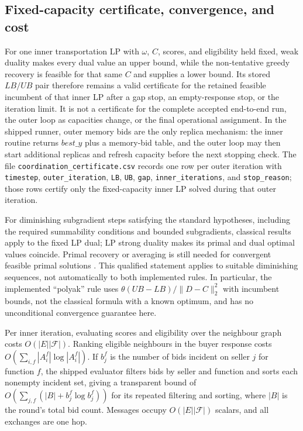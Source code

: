 \subsection{Fixed-capacity certificate, convergence, and cost}
For one inner transportation LP with $\omega$, $C$, scores, and eligibility
held fixed, weak duality makes every dual value an upper bound, while the
non-tentative greedy recovery is feasible for that same $C$ and supplies a
lower bound. Its stored $LB/UB$ pair therefore remains a valid certificate for
the retained feasible incumbent of that inner LP after a gap stop, an
empty-response stop, or the iteration limit. It is not a certificate for the
complete accepted end-to-end run, the outer loop as capacities change, or the
final operational assignment. In the shipped runner, outer memory bids are the
only replica mechanism: the inner routine returns $\textit{best\_y}$ plus a
memory-bid table, and the outer loop may then start additional replicas and
refresh capacity before the next stopping check. The file
\texttt{coordination\_certificate.csv} records one row per outer iteration with
\texttt{timestep}, \texttt{outer\_iteration}, \texttt{LB}, \texttt{UB},
\texttt{gap}, \texttt{inner\_iterations}, and \texttt{stop\_reason}; those rows
certify only the fixed-capacity inner LP solved during that outer iteration.

For diminishing subgradient steps satisfying the standard hypotheses,
including the required summability conditions and bounded subgradients,
classical results apply to the fixed LP dual; LP strong duality makes its primal
and dual optimal values coincide. Primal recovery or averaging is still needed
for convergent feasible primal solutions \citep{nedic2009,bertsekas1989}. This
qualified statement applies to suitable diminishing sequences, not
automatically to both implemented rules. In particular, the implemented
``polyak'' rule uses $\theta(UB-LB)/\lVert D-C\rVert_2^2$ with incumbent bounds,
not the classical formula with a known optimum, and has no unconditional
convergence guarantee here.

Per inner iteration, evaluating scores and eligibility over the neighbour graph
costs $O(|E||\mathcal F|)$. Ranking eligible neighbours in the buyer response
costs $O(\sum_{i,f}|A_i^f|\log|A_i^f|)$. If $b_j^f$ is
the number of bids incident on seller $j$ for function $f$, the shipped
evaluator filters bids by seller and function and sorts each nonempty incident
set, giving a transparent bound of
$O(\sum_{j,f}(|B|+b_j^f\log b_j^f))$ for its repeated filtering and sorting,
where $|B|$ is the round's total bid count. Messages occupy
$O(|E||\mathcal F|)$ scalars, and all exchanges are one hop.

